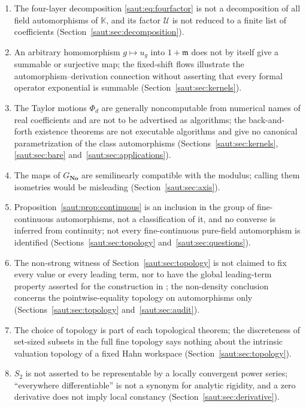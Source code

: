 \documentclass[11pt]{article}
\theoremstyle{definition}
\theoremstyle{remark}
\newcommand{\No}{\mathbf{No}}
\newcommand{\K}{\mathbb K}
\newcommand{\mm}{\mathfrak m}
\newcommand{\U}{\mathcal U}
\numberwithin{equation}{section}
\begin{document}
\begin{enumerate}[label=\arabic*.,leftmargin=2.2em]
transferred to an arbitrary fixed set-sized workspace
(Section~\ref{saut:sec:introduction}).
\item The four-layer decomposition \eqref{saut:eq:fourfactor} is not a
decomposition of all field automorphisms of $\K$, and its factor $\U$ is not
reduced to a finite list of coefficients (Section~\ref{saut:sec:decomposition}).
\item An arbitrary homomorphism $g\mapsto u_g$ into $1+\mm$ does not by itself
give a summable or surjective map; the fixed-shift flows illustrate the
automorphism--derivation connection without asserting that every formal
operator exponential is summable (Section~\ref{saut:sec:kernels}).
\item The Taylor motions $\Phi_d$ are generally noncomputable from
numerical names of real coefficients and are not to be advertised as
algorithms; the back-and-forth existence theorems are not executable
algorithms and give no canonical parametrization of the class
automorphisms (Sections~\ref{saut:sec:kernels}, \ref{saut:sec:bare}
and~\ref{saut:sec:applications}).
\item The maps of $G_{\No}$ are semilinearly compatible with the modulus;
calling them isometries would be misleading (Section~\ref{saut:sec:axis}).
\item Proposition~\ref{saut:prop:continuous} is an inclusion in the group of
fine-continuous automorphisms, not a classification of it, and no converse
is inferred from continuity; not every fine-continuous pure-field
automorphism is identified (Sections~\ref{saut:sec:topology}
and~\ref{saut:sec:questions}).
\item The non-strong witness of Section~\ref{saut:sec:topology} is not
claimed to fix every value or every leading term, nor to have the global
leading-term property asserted for the construction in \cite{KKS}; the
non-density conclusion concerns the pointwise-equality topology on
automorphisms only (Sections~\ref{saut:sec:topology}
and~\ref{saut:sec:audit}).
\item The choice of topology is part of each topological theorem; the
discreteness of set-sized subsets in the full fine topology says nothing
about the intrinsic valuation topology of a fixed Hahn workspace
(Section~\ref{saut:sec:topology}).
\item $S_2$ is not asserted to be representable by a locally convergent
power series; ``everywhere differentiable'' is not a synonym for analytic
rigidity, and a zero derivative does not imply local constancy
(Section~\ref{saut:sec:derivative}).

\end{enumerate}
\end{document}
